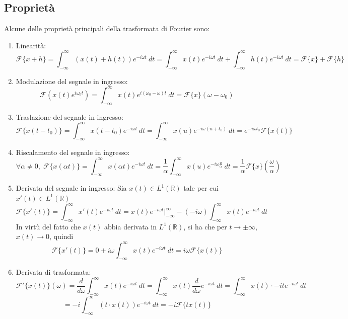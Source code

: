     \subsection{Proprietà}
    Alcune delle proprietà principali della trasformata di Fourier sono:
    \begin{enumerate}
        \item Linearità:
        \[
            \mathcal{F}\{x + h\} = \int_{-\infty}^{\infty} (x(t) + h(t)) e^{-i \omega t} \: dt = \int_{-\infty}^{\infty} x(t) e^{-i \omega t} \: dt + \int_{-\infty}^{\infty} h(t) e^{-i \omega t} \: dt = \mathcal{F}\{x\} + \mathcal{F}\{h\}
        \]
        \item Modulazione del segnale in ingresso:
        \[
            \mathcal{F}(x(t) e^{i \omega_{0} t}) = \int_{-\infty}^{\infty} x(t) e^{i (\omega_{0} - \omega) t} \: dt = \mathcal{F}\{x\}(\omega - \omega_{0})
        \]
        \item Traslazione del segnale in ingresso:
        \[
            \mathcal{F}\{x(t - t_{0})\} = \int_{-\infty}^{\infty} x(t - t_{0}) e^{-i \omega t} \: dt = \int_{-\infty}^{\infty} x(u) e^{-i \omega (u + t_{0})} \: dt = e^{-i \omega t_{0}} \mathcal{F}\{x(t)\}
        \]
        \item Riscalamento del segnale in ingresso:
        \[
            \forall \alpha \neq 0, \; \mathcal{F}\{x(\alpha t)\} = \int_{-\infty}^{\infty} x(\alpha t) e^{-i \omega t} \: dt = \frac{1}{\alpha} \int_{-\infty}^{\infty} x(u) e^{-i \omega \frac{u}{\alpha}} \: dt = \frac{1}{\alpha} \mathcal{F}\{x\}\left(\frac{\omega}{\alpha}\right)
        \]

        \item Derivata del segnale in ingresso: Sia $x(t) \in L^{1}(\mathbb{R})$ tale per cui $x'(t) \in L^{1}(\mathbb{R})$
        \[
            \mathcal{F}\{x'(t)\} = \int_{-\infty}^{\infty} x'(t) e^{-i \omega t} \: dt = x(t) e^{-i \omega t} \rvert_{-\infty}^{\infty} - (-i \omega) \int_{-\infty}^{\infty} x(t) e^{-i \omega t} \: dt
        \]
        In virtù del fatto che $x(t)$ abbia derivata in $L^{1}(\mathbb{R})$, si ha che per $t \rightarrow \pm \infty$, $x(t) \rightarrow 0$, quindi
        \[
            \mathcal{F}\{x'(t)\} = 0 + i \omega \int_{-\infty}^{\infty} x(t) e^{-i \omega t} \: dt = i \omega \mathcal{F}\{x(t)\}
        \]

        \item Derivata di trasformata:
        \[
            \mathcal{F}'\{x(t)\}(\omega) = \frac{d}{d\omega} \int_{-\infty}^{\infty} x(t) e^{-i \omega t} \: dt = \int_{-\infty}^{\infty} x(t) \frac{d}{d\omega} e^{-i \omega t} \: dt = \int_{-\infty}^{\infty} x(t) \cdot -it e^{-i \omega t} \: dt
        \]
        \[
            = -i \int_{-\infty}^{\infty} (t \cdot x(t)) e^{-i \omega t} \: dt = -i \mathcal{F}\{t x(t)\}
        \]


\end{enumerate}
